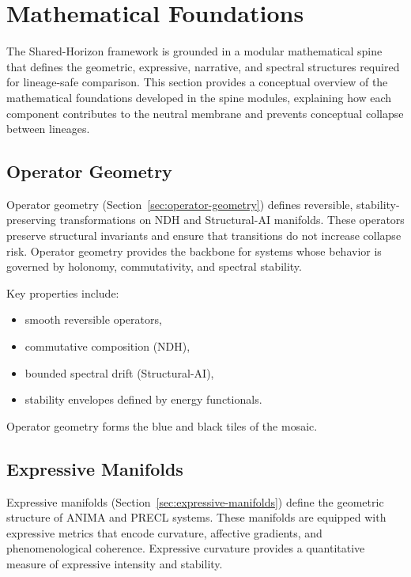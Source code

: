 
\section{Mathematical Foundations}
\label{sec:math-foundations}

The Shared-Horizon framework is grounded in a modular mathematical spine that
defines the geometric, expressive, narrative, and spectral structures required
for lineage-safe comparison. This section provides a conceptual overview of the
mathematical foundations developed in the spine modules, explaining how each
component contributes to the neutral membrane and prevents conceptual collapse
between lineages.

\subsection{Operator Geometry}

Operator geometry (Section~\ref{sec:operator-geometry}) defines reversible,
stability-preserving transformations on NDH and Structural-AI manifolds. These
operators preserve structural invariants and ensure that transitions do not
increase collapse risk. Operator geometry provides the backbone for systems
whose behavior is governed by holonomy, commutativity, and spectral stability.

Key properties include:

\begin{itemize}
    \item smooth reversible operators,
    \item commutative composition (NDH),
    \item bounded spectral drift (Structural-AI),
    \item stability envelopes defined by energy functionals.
\end{itemize}

Operator geometry forms the blue and black tiles of the mosaic.

\subsection{Expressive Manifolds}

Expressive manifolds (Section~\ref{sec:expressive-manifolds}) define the
geometric structure of ANIMA and PRECL systems. These manifolds are equipped
with expressive metrics that encode curvature, affective gradients, and
phenomenological coherence. Expressive curvature provides a quantitative measure
of expressive intensity and stability.

